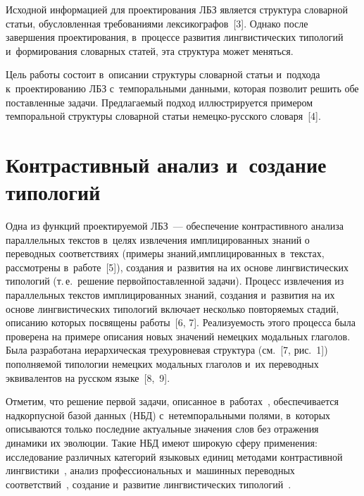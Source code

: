 \begin{multicols}{2}
 Исходной информацией для 
проектирования ЛБЗ является структура словарной статьи, обуслов\-лен\-ная 
требованиями лексикографов~[3]. Однако после завершения проектирования, в~процессе развития лингвистических типологий и~формирования словарных 
статей, эта структура может меняться.
    
    Цель работы состоит в~описании структуры словарной статьи и~подхода к~проектированию ЛБЗ с~темпоральными данными, которая позволит решить 
обе поставленные задачи. Предлагаемый подход иллюстрируется примером 
темпоральной структуры словарной статьи немецко-русского словаря~[4].

\vspace*{-6pt}
    
\section{Контрастивный анализ и~создание типологий}

\vspace*{-2pt}

    Одна из функций проектируемой ЛБЗ~--- обеспечение контрастивного 
анализа параллельных текс\-тов в~целях извлечения имплицированных знаний 
о переводных соответствиях (примеры знаний,\linebreak имплицированных в~текстах, 
рассмотрены в~рабо\-те~[5]), создания и~развития на их основе 
лингвистических типологий (т.\,е.\ решение первой\linebreak поставленной задачи). 
Процесс извлечения из параллельных текстов имплицированных знаний, 
создания и~развития на их основе лингвистических типологий включает 
несколько повторяемых стадий, описанию которых посвящены работы~[6, 7]. 
Реализуемость этого процесса была проверена на примере описания новых 
значений немецких модальных глаголов. Была разработана иерархическая 
трехуровневая структура (см.~[7, рис.~1]) по\-пол\-ня\-емой типологии 
немецких модальных глаголов и~их переводных эквивалентов на русском 
языке~[8,~9].
{

}
    
    Отметим, что решение первой задачи, описанное  
в~работах~\cite{2-gon, 5-gon, 6-gon, 7-gon}, обеспечивается надкорпусной 
базой данных (НБД) с~нетемпоральными полями, в~которых описываются 
только последние актуальные значения слов без отражения динамики их 
эволюции. Такие НБД имеют широкую сферу применения: исследование 
различных категорий языковых единиц методами контрастивной 
лингвистики~\cite{10-gon, 11-gon, 12-gon, 13-gon, 14-gon}, анализ 
профессиональных и~машинных переводных  
соответствий~\cite{15-gon, 16-gon}, создание и~развитие лингвистических 
типологий~\cite{17-gon}.
    

\end{multicols}
